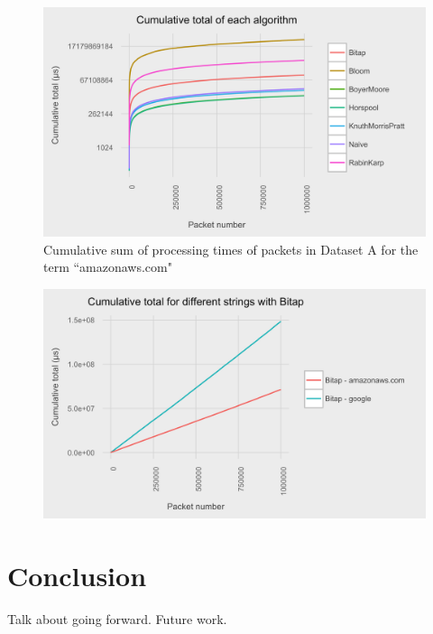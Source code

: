 \documentclass{article}
\begin{document}
\begin{figure}[h!bt]
  \centering
  \includegraphics[width=\textwidth]{graphs/cum_sum_packets_amazonaws-com.png}
  \caption{Cumulative sum of processing times of packets in Dataset A for the term ``amazonaws.com"}
\end{figure}

\begin{figure}[hbt]
  \centering
  \includegraphics[width=\textwidth]{graphs/term_length_compare-bitap.png}
  \caption{}
\end{figure}

\section{Conclusion}
Talk about going forward. Future work.
\nocite{*}




\end{document}
